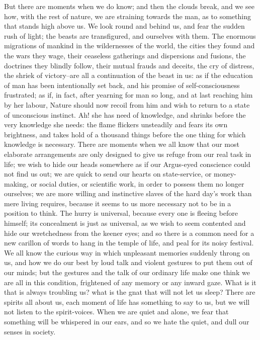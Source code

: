 But there are moments when we do know; and then the clouds break, and
we see how, with the rest of nature, we are straining towards the
man, as to something that stands high above us. We look round and
behind us, and fear the sudden rush of light; the beasts are
transfigured, and ourselves with them. The enormous migrations of
mankind in the wildernesses of the world, the cities they found and
the wars they wage, their ceaseless gatherings and dispersions and
fusions, the doctrines they blindly follow, their mutual frauds and
deceits, the cry of distress, the shriek of victory--are all a
continuation of the beast in us: as if the education of man has been
intentionally set back, and his promise of self-consciousness
frustrated; as if, in fact, after yearning for man so long, and at
last reaching him by her labour, Nature should now recoil from him
and wish to return to a state of unconscious instinct. Ah! she has
need of knowledge, and shrinks before the very knowledge she needs:
the flame flickers unsteadily and fears its own brightness, and takes
hold of a thousand things before the one thing for which knowledge is
necessary. There are moments when we all know that our most elaborate
arrangements are only designed to give us refuge from our real task
in life; we wish to hide our heads somewhere as if our Argus-eyed
conscience could not find us out; we are quick to send our hearts on
state-service, or money-making, or social duties, or scientific work,
in order to possess them no longer ourselves; we are more willing and
instinctive slaves of the hard day's work than mere living requires,
because it seems to us more necessary not to be in a position to
think. The hurry is universal, because every one is fleeing before
himself; its concealment is just as universal, as we wish to seem
contented and hide our wretchedness from the keener eyes; and so
there is a common need for a new carillon of words to hang in the
temple of life, and peal for its noisy festival. We all know the
curious way in which unpleasant memories suddenly throng on us, and
how we do our best by loud talk and violent gestures to put them out
of our minds; but the gestures and the talk of our ordinary life make
one think we are all in this condition, frightened of any memory or
any inward gaze. What is it that is always troubling us? what is the
gnat that will not let us sleep? There are spirits all about us, each
moment of life has something to say to us, but we will not listen to
the spirit-voices. When we are quiet and alone, we fear that
something will be whispered in our ears, and so we hate the quiet,
and dull our senses in society.

